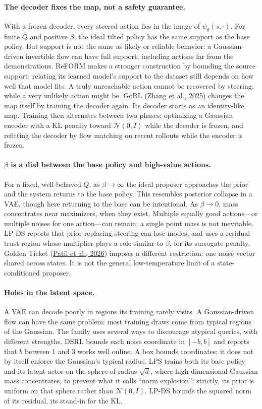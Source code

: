 \paragraph{The decoder fixes the map, not a safety guarantee.} With a frozen decoder, every steered action lies in the image of $\psi_\theta(s, \cdot)$. For finite $Q$ and positive $\beta$, the ideal tilted policy has the same support as the base policy. But support is not the same as likely or reliable behavior: a Gaussian-driven invertible flow can have full support, including actions far from the demonstrations. ReFORM makes a stronger construction by bounding the source support; relating its learned model's support to the dataset still depends on how well that model fits. A truly unreachable action cannot be recovered by steering, while a very unlikely action might be. GoRL (\hyperlink{ref:20}{Zhang et al., 2025}) changes the map itself by training the decoder again. Its decoder starts as an identity-like map. Training then alternates between two phases: optimizing a Gaussian encoder with a KL penalty toward $\mathcal{N}(0, I)$ while the decoder is frozen, and refitting the decoder by flow matching on recent rollouts while the encoder is frozen.

\paragraph{$\beta$ is a dial between the base policy and high-value actions.} For a fixed, well-behaved $Q$, as $\beta \to \infty$ the ideal proposer approaches the prior and the system returns to the base policy. This resembles posterior collapse in a VAE, though here returning to the base can be intentional. As $\beta \to 0$, mass concentrates near maximizers, when they exist. Multiple equally good actions---or multiple noises for one action---can remain; a single point mass is not inevitable. LP-DS reports that prior-replacing steering can lose modes, and uses a residual trust region whose multiplier plays a role similar to $\beta$, for its surrogate penalty. Golden Ticket (\hyperlink{ref:15}{Patil et al., 2026}) imposes a different restriction: one noise vector shared across states. It is not the general low-temperature limit of a state-conditioned proposer.

\paragraph{Holes in the latent space.} A VAE can decode poorly in regions its training rarely visits. A Gaussian-driven flow can have the same problem: most training draws come from typical regions of the Gaussian. The family uses several ways to discourage atypical queries, with different strengths. DSRL bounds each noise coordinate in $[-b,b]$ and reports that $b$ between 1 and 3 works well online. A box bounds coordinates; it does not by itself enforce the Gaussian's typical radius. LPS trains both its base policy and its latent actor on the sphere of radius $\sqrt{d}$, where high-dimensional Gaussian mass concentrates, to prevent what it calls ``norm explosion''; strictly, its prior is uniform on that sphere rather than $\mathcal{N}(0, I)$. LP-DS bounds the squared norm of its residual, its stand-in for the KL.

